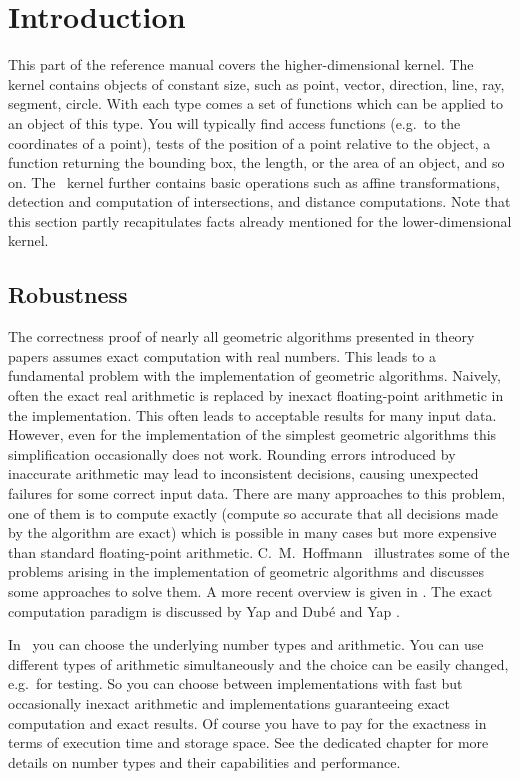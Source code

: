 \section{Introduction}

This part of the reference manual covers the higher-dimensional
kernel.  The kernel contains objects of constant size, such as point,
vector, direction, line, ray, segment, circle.  With each type comes a
set of functions which can be applied to an object of this type.  You
will typically find access functions (e.g.\ to the coordinates of a
point), tests of the position of a point relative to the object, a
function returning the bounding box, the length, or the area of an
object, and so on.  The \cgal\ kernel further contains basic
operations such as affine transformations, detection and computation
of intersections, and distance computations. Note that this section
partly recapitulates facts already mentioned for the lower-dimensional
kernel.

\subsection{Robustness}

The correctness proof of nearly all geometric algorithms presented in
theory papers assumes exact computation with real numbers.  This leads
to a fundamental problem with the implementation of geometric
algorithms.  Naively, often the exact real arithmetic is replaced by
inexact floating-point arithmetic in the implementation.  This often
leads to acceptable results for many input data.  However, even for
the implementation of the simplest geometric algorithms this
simplification occasionally does not work.  Rounding errors introduced
by inaccurate arithmetic may lead to inconsistent decisions, causing
unexpected failures for some correct input data.  There are many
approaches to this problem, one of them is to compute exactly (compute
so accurate that all decisions made by the algorithm are exact) which
is possible in many cases but more expensive than standard
floating-point arithmetic.  C.~M.~Hoffmann~\cite{h-gsm-89,h-pargc-89}
illustrates some of the problems arising in the implementation of
geometric algorithms and discusses some approaches to solve them.  A
more recent overview is given in \cite{s-rpigc-00}.  The exact
computation paradigm is discussed by Yap and Dub\'e \cite{yd-ecp-95}
and Yap \cite{y-tegc-97}.

In \cgal\ you can choose the underlying number types and arithmetic.
You can use different types of arithmetic simultaneously and the
choice can be easily changed, e.g.\ for testing.  So you can choose
between implementations with fast but occasionally inexact arithmetic
and implementations guaranteeing exact computation and exact results.
Of course you have to pay for the exactness in terms of execution time
and storage space.  See the dedicated chapter for more details
on number types and their capabilities and performance.

